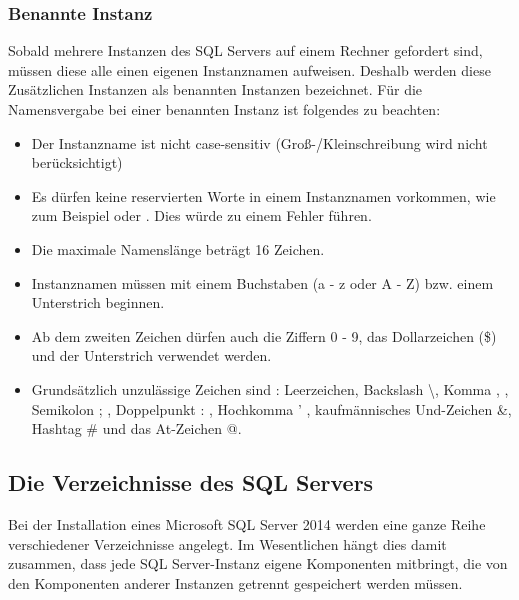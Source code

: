         \subsubsection{Benannte Instanz}
          Sobald mehrere Instanzen des SQL Servers auf einem Rechner gefordert
          sind, müssen diese alle einen eigenen Instanznamen aufweisen. Deshalb
          werden diese Zusätzlichen Instanzen als benannten Instanzen bezeichnet.
          Für die Namensvergabe bei einer benannten Instanz ist folgendes zu beachten:
          \begin{itemize}
              \item Der Instanzname ist nicht case-sensitiv
              (Groß-/Kleinschreibung wird nicht berücksichtigt)
              \item Es dürfen keine reservierten Worte in einem Instanznamen
              vorkommen, wie zum Beispiel  oder
              .
              Dies würde zu einem Fehler führen.
              \item Die maximale Namenslänge beträgt 16 Zeichen.
              \item Instanznamen müssen mit einem Buchstaben (a - z oder A - Z)
              bzw. einem Unterstrich beginnen.
              \item Ab dem zweiten Zeichen dürfen auch die Ziffern 0 - 9, das
              Dollarzeichen (\$) und der Unterstrich verwendet werden.
              \item Grundsätzlich unzulässige Zeichen sind :
              Leerzeichen, Backslash \textbackslash, Komma , , Semikolon ; ,
              Doppelpunkt : , Hochkomma ' , kaufmännisches Und-Zeichen \&, Hashtag
              \# und das At-Zeichen @.
          \end{itemize}
      \subsection{Die Verzeichnisse des SQL Servers}
        Bei der Installation eines Microsoft SQL Server 2014 werden eine ganze
        Reihe verschiedener Verzeichnisse angelegt. Im Wesentlichen hängt dies
        damit zusammen, dass jede SQL Server-Instanz eigene Komponenten mitbringt,
        die von den Komponenten anderer Instanzen getrennt gespeichert werden
        müssen.
